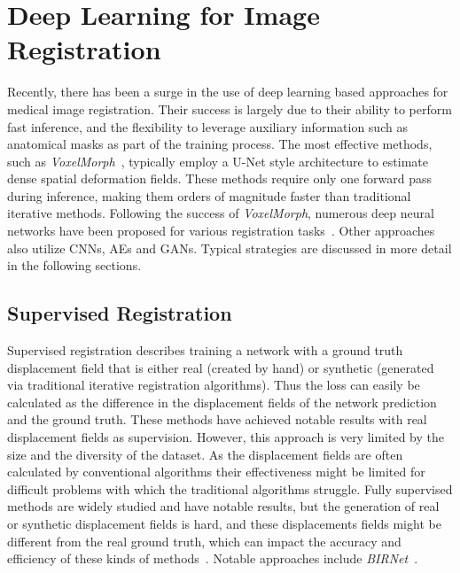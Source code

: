\documentclass[english,version-2022-01]{uzl-thesis} %
\begin{document}
\section{Deep Learning for Image Registration} \label{Sec:DLImageRegistration}
Recently, there has been a surge in the use of deep learning based approaches for medical image registration. Their success is largely due to their ability to perform fast inference, and the flexibility to leverage auxiliary information such as anatomical masks as part of the training process. The most effective methods, such as \emph{VoxelMorph}~\cite{Voxelmorph}, typically employ a U-Net style architecture to estimate dense spatial deformation fields. These methods require only one forward pass during inference, making them orders of magnitude faster than traditional iterative methods. Following the success of \emph{VoxelMorph}, numerous deep neural networks have been proposed for various registration tasks~\cite{Fourier-Net+}. Other approaches also utilize CNNs, AEs and GANs. Typical strategies are discussed in more detail in the following sections.

\subsection{Supervised Registration} \label{SubSec:SupervisedRegistration}
Supervised registration describes training a network with a ground truth displacement field that is either real (created by hand) or synthetic (generated via traditional iterative registration algorithms). Thus the loss can easily be calculated as the difference in the displacement fields of the network prediction and the ground truth. These methods have achieved notable results with real displacement fields as supervision. However, this approach is very limited by the size and the diversity of the dataset. As the displacement fields are often calculated by conventional algorithms their effectiveness might be limited for difficult problems with which the traditional algorithms struggle. Fully supervised methods are widely studied and have notable results, but the generation of real or synthetic displacement fields is hard, and these displacements fields might be different from the real ground truth, which can impact the accuracy and efficiency of these kinds of methods~\cite{Zou2022}. Notable approaches include \emph{BIRNet}~\cite{BIRNet}.
\end{document}
